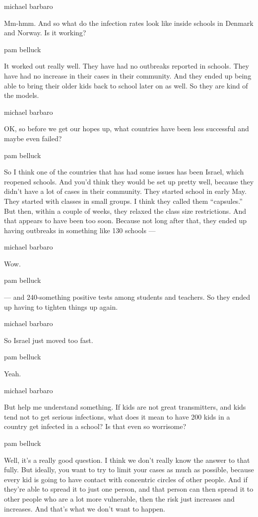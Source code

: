 michael barbaro

Mm-hmm. And so what do the infection rates look like inside schools in
Denmark and Norway. Is it working?

pam belluck

It worked out really well. They have had no outbreaks reported in
schools. They have had no increase in their cases in their community.
And they ended up being able to bring their older kids back to school
later on as well. So they are kind of the models.

michael barbaro

OK, so before we get our hopes up, what countries have been less
successful and maybe even failed?

pam belluck

So I think one of the countries that has had some issues has been
Israel, which reopened schools. And you'd think they would be set up
pretty well, because they didn't have a lot of cases in their community.
They started school in early May. They started with classes in small
groups. I think they called them ``capsules.'' But then, within a couple
of weeks, they relaxed the class size restrictions. And that appears to
have been too soon. Because not long after that, they ended up having
outbreaks in something like 130 schools ---

michael barbaro

Wow.

pam belluck

--- and 240-something positive tests among students and teachers. So
they ended up having to tighten things up again.

michael barbaro

So Israel just moved too fast.

pam belluck

Yeah.

michael barbaro

But help me understand something. If kids are not great transmitters,
and kids tend not to get serious infections, what does it mean to have
200 kids in a country get infected in a school? Is that even so
worrisome?

pam belluck

Well, it's a really good question. I think we don't really know the
answer to that fully. But ideally, you want to try to limit your cases
as much as possible, because every kid is going to have contact with
concentric circles of other people. And if they're able to spread it to
just one person, and that person can then spread it to other people who
are a lot more vulnerable, then the risk just increases and increases.
And that's what we don't want to happen.

